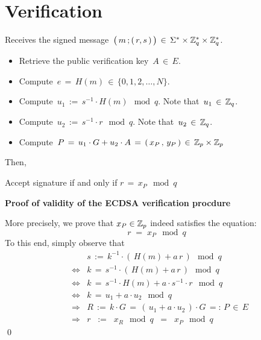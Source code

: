 
\section{Verification}
\setcounter{theorem}{0}
\setcounter{equation}{0}


Receives the signed message
\,$\left(\,m \,\overset{{\color{white}.}}{;}\,(\,r,s\,)\,\right) \,\in\, \Sigma^{*} \times \Z_{q}^{*} \times \Z_{q}^{*}$.

\begin{itemize}
\item
	Retrieve the public verification key \,$A \,\in\, E$.
\item
	Compute \,$e \,=\, H(m) \,\in\, \{0,1,2,\ldots,N\}$.
\item
	Compute \,$u_{1} \,:=\, s^{-1} \cdot H(m) \!\mod q$.\; Note that \,$u_{1}\,\in\, \mathbb{Z}_{q}$.
\item
	Compute \,$u_{2} \,:=\, s^{-1} \cdot r \!\mod q$.\; Note that \,$u_{2}\,\in\, \mathbb{Z}_{q}$.
\item
	Compute \,$P \,=\, u_{1}\cdot G +  u_{2} \cdot A \,=\, (\,x_{P}\,,\, y_{P}\,) \,\in\, \mathbb{Z}_{p} \times \mathbb{Z}_{p}$
\end{itemize}

\noindent
Then,
\begin{center}
Accept signature\;\; if and only if \;\;$r \,=\, x_{P} \!\mod q$
\end{center}


\vskip 0.8cm
\noindent
\textbf{Proof of validity of the ECDSA verification procdure}

\vskip 0.3cm
\noindent
More precisely, we prove that $x_{P} \in \mathbb{Z}_{p}$ indeed satisfies the equation:
\begin{equation*}
r \;=\; x_{P} \!\mod q
\end{equation*}
To this end, simply observe that
\begin{eqnarray*}
&&
	s \,:=\, k^{-1} \cdot\left(\,H(m) + a\,r\,\right) \!\mod q
\\
&\Longleftrightarrow&
	k \,=\, s^{-1} \cdot\left(\,H(m) + a\,r\,\right)	\!\mod q
\\
&\Longleftrightarrow&
	k \,=\, s^{-1} \cdot H(m) + a \cdot s^{-1} \cdot r \!\mod q
\\
&\Longleftrightarrow&
	k \,=\, u_{1} + a \cdot u_{2} \!\mod q
\\
&\Longrightarrow&
	R \,:=\, k \cdot G \,=\, \left(\,u_{1} + a \cdot u_{2} \,\right) \cdot G \,=:\, P \,\in\, E 
\\
&\Longrightarrow&
	r \;\;:=\;\; x_{R}\!\!\mod q \;\;=\;\; x_{P} \!\!\mod q
\end{eqnarray*}
\qed

